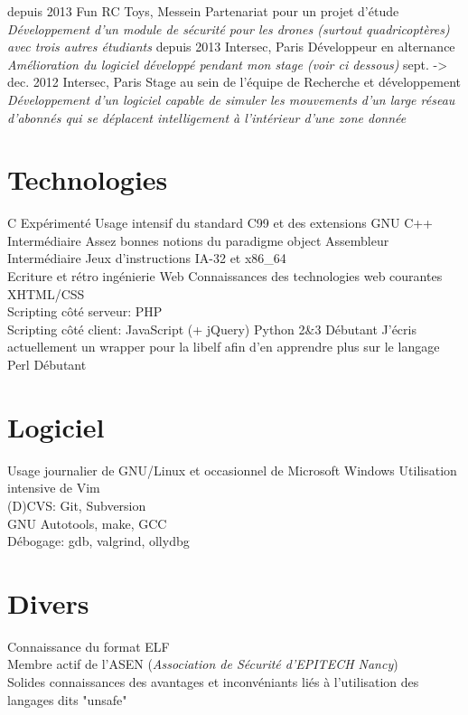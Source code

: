 \documentclass[]{friggeri-cv}
\begin{document}
\begin{entrylist}
  \entry
    {depuis 2013}
    {Fun RC Toys, Messein}
    {Partenariat pour un projet d'étude}
    {\emph{Développement d'un module de sécurité pour les drones (surtout quadricoptères) avec trois autres étudiants}}
  \entry
    {depuis 2013}
    {Intersec, Paris}
    {Développeur en alternance}
    {\emph{Amélioration du logiciel développé pendant mon stage (voir ci dessous)}}
  \entry
    {sept. -> dec. 2012}
    {Intersec, Paris}
    {Stage au sein de l'équipe de Recherche et développement}
    {\emph{Développement d'un logiciel capable de simuler les mouvements d'un large réseau d'abonnés qui se déplacent intelligement à l'intérieur d'une zone donnée}}
\end{entrylist}

\section{Technologies}
\begin{entrylist}
  \entry
    {C}
    {Expérimenté}
    {}
    {Usage intensif du standard C99 et des extensions GNU}
  \entry
    {C++}
    {Intermédiaire}
    {}
    {Assez bonnes notions du paradigme object}
  \entry
    {Assembleur}
    {Intermédiaire}
    {}
    {Jeux d'instructions IA-32 et x86\_64\\
    Ecriture et rétro ingénierie}
  \entry
    {Web}
    {Connaissances des technologies web courantes}
    {}
    {XHTML/CSS\\
        Scripting côté serveur: PHP\\
        Scripting côté client: JavaScript (+ jQuery)
    }
  \entry
    {Python 2\&3}
    {Débutant}
    {}
    {J'écris actuellement un wrapper pour la libelf afin d'en apprendre plus sur le langage}
  \entry
    {Perl}
    {Débutant}
    {}
    {}
\end{entrylist}
\section{Logiciel}
\begin{entrylist}
  \entry
    {}
    {Usage journalier de GNU/Linux et occasionnel de Microsoft Windows}
    {}
    {Utilisation intensive de Vim\\
    (D)CVS: Git, Subversion\\
    GNU Autotools, make, GCC\\
    Débogage: gdb, valgrind, ollydbg}

\end{entrylist}

\section{Divers}
\begin{entrylist}
  \entry
    {}
    {}
    {}
    {Connaissance du format ELF\\
    Membre actif de l'ASEN (\emph{Association de Sécurité d'EPITECH Nancy})\\
    Solides connaissances des avantages et inconvéniants liés à l'utilisation des langages dits "unsafe"}
\end{entrylist}
\end{document}
